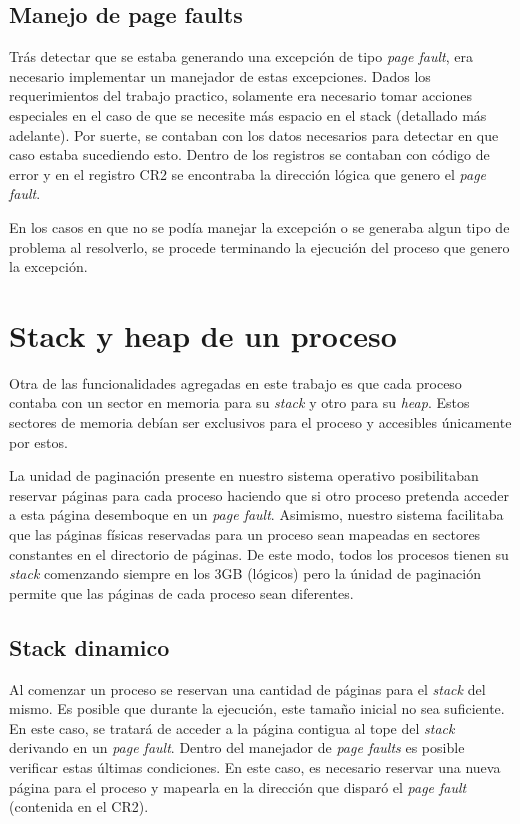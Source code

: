 \documentclass[a4paper,10pt]{article}
\begin{document}
\subsection{Manejo de page faults}

Trás detectar que se estaba generando una excepción de tipo \textit{page fault}, era necesario implementar un manejador de estas 
excepciones. Dados los requerimientos del trabajo practico, solamente era necesario tomar acciones especiales en el caso de que 
se necesite más espacio en el stack (detallado más adelante). Por suerte, se contaban con los datos necesarios para detectar en que 
caso estaba sucediendo esto. Dentro de los registros se contaban con código de error y en el registro CR2 se encontraba la dirección 
lógica que genero el \textit{page fault}.

En los casos en que no se podía manejar la excepción o se generaba algun tipo de problema al resolverlo, se procede terminando la 
ejecución del proceso que genero la excepción.

\newpage

\section{Stack y heap de un proceso}

Otra de las funcionalidades agregadas en este trabajo es que cada proceso contaba con un sector en memoria para su \textit{stack} y 
otro para su \textit{heap}. Estos sectores de memoria debían ser exclusivos para el proceso y accesibles únicamente por estos.

La unidad de paginación presente en nuestro sistema operativo posibilitaban reservar páginas para cada proceso haciendo que si otro 
proceso pretenda acceder a esta página desemboque en un \textit{page fault}. Asimismo, nuestro sistema facilitaba que las 
páginas físicas reservadas para un proceso sean mapeadas en sectores constantes en el directorio de páginas. De este modo, 
todos los procesos tienen su \textit{stack} comenzando siempre en los 3GB (lógicos) pero la únidad de paginación permite que las 
páginas de cada proceso sean diferentes.

\subsection{Stack dinamico}

Al comenzar un proceso se reservan una cantidad de páginas para el \textit{stack} del mismo. Es posible que durante la ejecución, 
este tamaño inicial no sea suficiente. En este caso, se tratará de acceder a la página contigua al tope del \textit{stack} derivando 
en un \textit{page fault}. Dentro del manejador de \textit{page faults} es posible verificar estas últimas condiciones. En este caso, 
es necesario reservar una nueva página para el proceso y mapearla en la dirección que disparó el \textit{page fault} (contenida en 
el CR2). 
\end{document}
